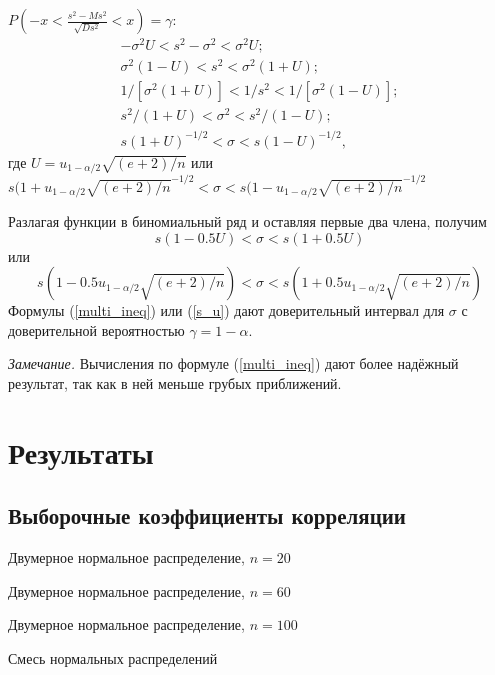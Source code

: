 \documentclass[12pt]{article}
\begin{document}
	$P\left(-x < \frac{s^{2}-Ms^{2}}{\sqrt{D s^{2}}} < x\right) = \gamma$:
	\begin{equation}
		\begin{split}
			-\sigma^{2}U < s^{2} -\sigma^{2} < \sigma^{2}U; \\
			\sigma^{2}(1-U) < s^{2} < \sigma^{2}(1 + U); \\
			1/[\sigma^{2}(1 + U)] < 1/s^{2} < 1/[\sigma^{2}(1-U)];\\
			s^{2}/(1 + U) < \sigma^{2} < s^{2}/(1-U);\\
			s(1 + U)^{-1/2} < \sigma < s(1-U)^{-1/2},
		\end{split}
		\label{multi_ineq}
	\end{equation}
	где $U = u_{1-\alpha/2}\sqrt{(e+2)/n}$ или $s(1 + u_{1-\alpha/2}\sqrt{(e + 2) / n}^{-1/2} < \sigma < s(1 - u_{1-\alpha/2}\sqrt{(e + 2) / n}^{-1/2}$
	
	Разлагая функции в биномиальный ряд и оставляя первые два члена, получим
	\begin{equation}
		s(1-0.5U) < \sigma < s(1 + 0.5U)
		\label{s_U}
	\end{equation}
	или
	\begin{equation}
		s(1-0.5u_{1-\alpha/2}\sqrt{(e + 2)/n}) < \sigma < s(1+0.5u_{1-\alpha/2}\sqrt{(e + 2)/n})
		\label{s_u}
	\end{equation}
	Формулы (\ref{multi_ineq}) или (\ref{s_u}) дают доверительный интервал для $\sigma$ с доверительной вероятностью $\gamma = 1-\alpha$. 
	
	\textit{Замечание.} Вычисления по формуле (\ref{multi_ineq}) дают более надёжный результат, так как в ней меньше грубых приближений.
	
	\section{Результаты}
	
	\subsection{Выборочные коэффициенты корреляции}
	
	\begin{table}[H]
		\centering
		
		\caption{Двумерное нормальное распределение, $n = 20$}
	\end{table}
	\begin{table}[H]
		\centering
		
		\caption{Двумерное нормальное распределение, $n = 60$}
	\end{table}
	\begin{table}[H]
		\centering
		
		\caption{Двумерное нормальное распределение, $n = 100$}
	\end{table}
	\begin{table}[H]
		\centering
		
		\caption{Смесь нормальных распределений}
	\end{table}
	
\end{document}
